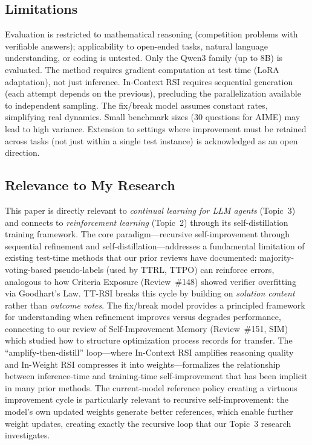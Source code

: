 \documentclass[11pt,a4paper]{article}
\begin{document}
\subsection{Limitations}
Evaluation is restricted to mathematical reasoning (competition problems with verifiable answers); applicability to open-ended tasks, natural language understanding, or coding is untested. Only the Qwen3 family (up to 8B) is evaluated. The method requires gradient computation at test time (LoRA adaptation), not just inference. In-Context RSI requires sequential generation (each attempt depends on the previous), precluding the parallelization available to independent sampling. The fix/break model assumes constant rates, simplifying real dynamics. Small benchmark sizes (30 questions for AIME) may lead to high variance. Extension to settings where improvement must be retained across tasks (not just within a single test instance) is acknowledged as an open direction.

\subsection{Relevance to My Research}
This paper is directly relevant to \emph{continual learning for LLM agents} (Topic~3) and connects to \emph{reinforcement learning} (Topic~2) through its self-distillation training framework. The core paradigm---recursive self-improvement through sequential refinement and self-distillation---addresses a fundamental limitation of existing test-time methods that our prior reviews have documented: majority-voting-based pseudo-labels (used by TTRL, TTPO) can reinforce errors, analogous to how Criteria Exposure (Review~\#148) showed verifier overfitting via Goodhart's Law. TT-RSI breaks this cycle by building on \emph{solution content} rather than \emph{outcome votes}. The fix/break model provides a principled framework for understanding when refinement improves versus degrades performance, connecting to our review of Self-Improvement Memory (Review~\#151, SIM) which studied how to structure optimization process records for transfer. The ``amplify-then-distill'' loop---where In-Context RSI amplifies reasoning quality and In-Weight RSI compresses it into weights---formalizes the relationship between inference-time and training-time self-improvement that has been implicit in many prior methods. The current-model reference policy creating a virtuous improvement cycle is particularly relevant to recursive self-improvement: the model's own updated weights generate better references, which enable further weight updates, creating exactly the recursive loop that our Topic~3 research investigates.
\end{document}

